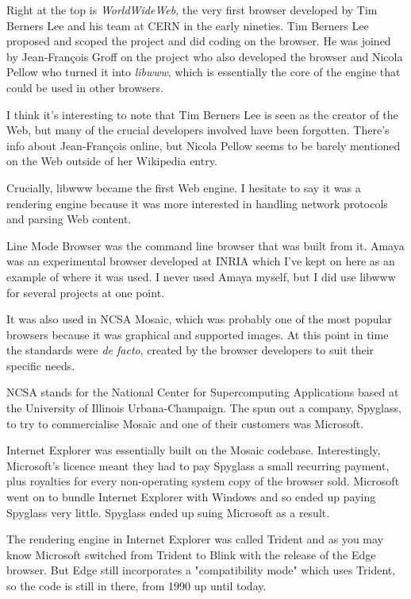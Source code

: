 \documentclass{article}
\begin{document}
Right at the top is {\it WorldWideWeb}, the very first browser developed by Tim Berners Lee and his team at CERN in the early nineties. Tim Berners Lee proposed and scoped the project and did coding on the browser. He was joined by Jean-François Groff on the project who also developed the browser and Nicola Pellow who turned it into {\it libwww}, which is essentially the core of the engine that could be used in other browsers.

I think it's interesting to note that Tim Berners Lee is seen as the creator of the Web, but many of the crucial developers involved have been forgotten. There's info about Jean-François online, but Nicola Pellow seems to be barely mentioned on the Web outside of her Wikipedia entry.

Crucially, libwww became the first Web engine. I hesitate to say it was a rendering engine because it was more interested in handling network protocols and parsing Web content.

Line Mode Browser was the command line browser that was built from it. Amaya was an experimental browser developed at INRIA which I've kept on here as an example of where it was used. I never used Amaya myself, but I did use libwww for several projects at one point.

It was also used in NCSA Mosaic, which was probably one of the most popular browsers because it was graphical and supported images. At this point in time the standards were {\it de facto}, created by the browser developers to suit their specific needs.

NCSA stands for the National Center for Supercomputing Applications based at the University of Illinois Urbana-Champaign. The spun out a company, Spyglass, to try to commercialise Mosaic and one of their customers was Microsoft.

Internet Explorer was essentially built on the Mosaic codebase. Interestingly, Microsoft's licence meant they had to pay Spyglass a small recurring payment, plus royalties for every non-operating system copy of the browser sold. Microsoft went on to bundle Internet Explorer with Windows and so ended up paying Spyglass very little. Spyglass ended up suing Microsoft as a result.

The rendering engine in Internet Explorer was called Trident and as you may know Microsoft switched from Trident to Blink with the release of the Edge browser. But Edge still incorporates a "compatibility mode" which uses Trident, so the code is still in there, from 1990 up until today.
\end{document}
